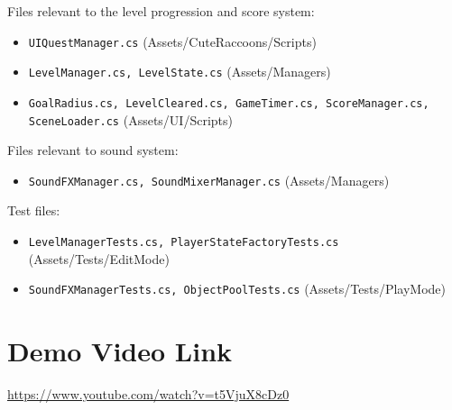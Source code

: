 \documentclass[10pt]{final_report}
\begin{document}
Files relevant to the level progression and score system:
\begin{itemize}
    \item \texttt{UIQuestManager.cs} (Assets/CuteRaccoons/Scripts)
    \item \texttt{LevelManager.cs, LevelState.cs} (Assets/Managers)
    \item \texttt{GoalRadius.cs, LevelCleared.cs, GameTimer.cs, ScoreManager.cs, SceneLoader.cs} (Assets/UI/Scripts)
\end{itemize}

Files relevant to sound system:
\begin{itemize}
    \item \texttt{SoundFXManager.cs, SoundMixerManager.cs} (Assets/Managers)
\end{itemize}

Test files:
\begin{itemize}
    \item \texttt{LevelManagerTests.cs, PlayerStateFactoryTests.cs} (Assets/Tests/EditMode)
    \item \texttt{SoundFXManagerTests.cs, ObjectPoolTests.cs} (Assets/Tests/PlayMode)
\end{itemize}

\section{Demo Video Link}
\url{https://www.youtube.com/watch?v=t5VjuX8cDz0}

\newpage
{}
{}

\raggedright

\end{document}
